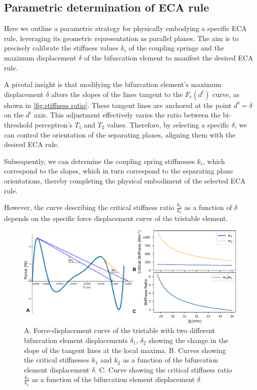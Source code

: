 \subsection*{Parametric determination of ECA rule}
Here we outline a parametric strategy for physically embodying a specific ECA rule, leveraging its geometric representation as parallel planes. The aim is to precisely calibrate the stiffness values \( k_i \) of the coupling springs and the maximum displacement \( \delta \) of the bifurcation element to manifest the desired ECA rule.

A pivotal insight is that modifying the bifurcation element's maximum displacement \( \delta \) alters the slopes of the lines tangent to the \( F_r(d^t) \) curve, as shown in \autoref*{fig:stiffness ratio}. These tangent lines are anchored at the point \( d^b = \delta \) on the \( d^t \) axis. This adjustment effectively varies the ratio between the bi-threshold perceptron's \( T_1 \) and \( T_2 \) values. Therefore, by selecting a specific \( \delta \), we can control the orientation of the separating planes, aligning them with the desired ECA rule. 

Subsequently, we can determine the coupling spring stiffnesses \( k_i \), which correspond to the slopes, which in turn correspond to the separating plane orientations, thereby completing the physical embodiment of the selected ECA rule.

However, the curve describing the critical stiffness ratio \( \frac{k_2}{k_1} \) as a function of \(\delta\) depends on the specific force displacement curve of the tristable element. 


\begin{figure}[H]
    \centering
    \includegraphics[width=\textwidth]{images/SVGs/stiffness_ratio.pdf}
    \caption{A. Force-displacement curve of the tristable with two different bifurcation element displacements \(\delta_1\), \(\delta_2\) showing the change in the slope of the tangent lines at the local maxima. B. Curves showing the critical stiffnesses \(k_1\) and \(k_2\) as a function of the bifurcation element displacement \(\delta\). C. Curve showing the critical stiffness ratio \(\frac{k_2}{k_1}\) as a function of the bifurcation element displacement \(\delta\)}
    \label{fig:stiffness ratio}
\end{figure}



